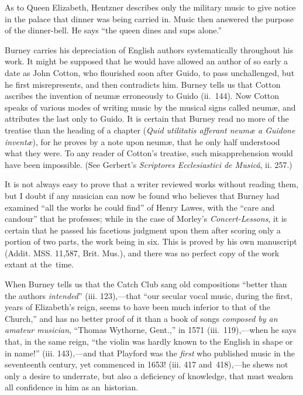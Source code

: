 As to Queen Elizabeth, Hentzner describes only the military music to give notice
in the palace that dinner was being carried in. Music then answered the purpose
of the dinner-bell. He says “the queen dines and sups alone.”

Burney carries his depreciation of English authors systematically throughout
his work. It might be supposed that he would have allowed an author of so early
a date as John Cotton, who flourished soon after Guido, to pass unchallenged, but
he first misrepresents, and then contradicts him. Burney tells us that Cotton
ascribes the invention of neumæ erroneously to Guido (ii.~144). Now Cotton
speaks of various modes of writing music by the musical signs called neumæ, and
attributes the last only to Guido. It is certain that Burney read no more of the
treatise than the heading of a chapter (\textit{Quid utilitatis afferant neumæ a Guidone
inventæ}), for he proves by a note upon neumæ, that he only half understood what
they were. To any reader of Cotton’s treatise, such misapprehension would have
been impossible. (See Gerbert’s \textit{Scriptores Ecclesiastici de Musicâ}, ii. 257.)

It is not always easy to prove that a writer reviewed works without reading
them, but I doubt if any musician can now be found who believes that Burney
had examined “all the works he could find” of Henry Lawes, with the “care
and candour” that he professes; while in the case of Morley’s \textit{Concert-Lessons},
it is certain that he passed his facetious judgment upon them after scoring only
a portion of two parts, the work being in six. This is proved by his own manuscript
(Addit. MSS. 11,587, Brit. Mus.), and there was no perfect copy of the
work extant at the~time.

When Burney tells us that the Catch Club sang old compositions “better than
the authors \textit{intended}” (iii. 123),—that “our secular vocal music, during the first,
years of Elizabeth’s reign, seems to have been much inferior to that of the Church,”
and has no better proof of it than a book of songs \textit{composed by an amateur musician},
“Thomas Wythorne, Gent.,” in 1571 (iii.~119),—when he says that, in
the same reign, “the violin was hardly known to the English in shape or in
name!” (iii. 143),—and that Playford was the \textit{first} who published music in the
seventeenth century, yet commenced in 1653! (iii. 417 and~418),—he shews not
only a desire to underrate, but also a deficiency of knowledge, that must weaken
all confidence in him as an~historian.

